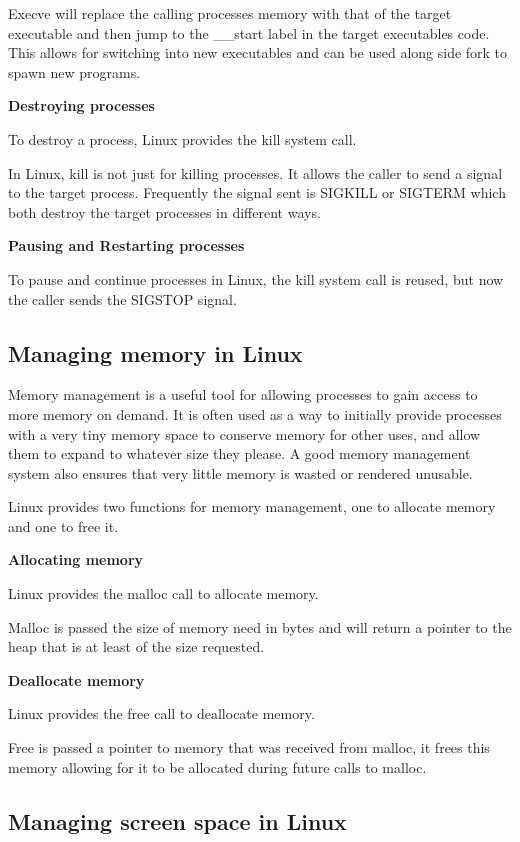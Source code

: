 \documentclass[a4paper]{report}
\begin{document}
Execve will replace the calling processes memory with that of the target executable and then jump to the \_\_start label in the target executables code. This allows for switching into new executables and can be used along side fork to spawn new programs.

\noindent
\textbf{Destroying processes}

To destroy a process, Linux provides the kill system call. \cite{manKill}

In Linux, kill is not just for killing processes. It allows the caller to send a signal to the target process. Frequently the signal sent is SIGKILL or SIGTERM which both destroy the target processes in different ways.

\noindent
\textbf{Pausing and Restarting processes}

To pause and continue processes in Linux, the kill system call is reused, but now the caller sends the SIGSTOP signal.

\subsection{Managing memory in Linux}

Memory management is a useful tool for allowing processes to gain access to more memory on demand. It is often used as a way to initially provide processes with a very tiny memory space to conserve memory for other uses, and allow them to expand to whatever size they please. A good memory management system also ensures that very little memory is wasted or rendered unusable.

Linux provides two functions for memory management, one to allocate memory and one to free it.

\noindent
\textbf{Allocating memory}

Linux provides the malloc call to allocate memory. \cite{manMalloc}

Malloc is passed the size of memory need in bytes and will return a pointer to the heap that is at least of the size requested.

\noindent
\textbf{Deallocate memory}

Linux provides the free call to deallocate memory.

Free is passed a pointer to memory that was received from malloc, it frees this memory allowing for it to be allocated during future calls to malloc.



\subsection{Managing screen space in Linux}
\end{document}
